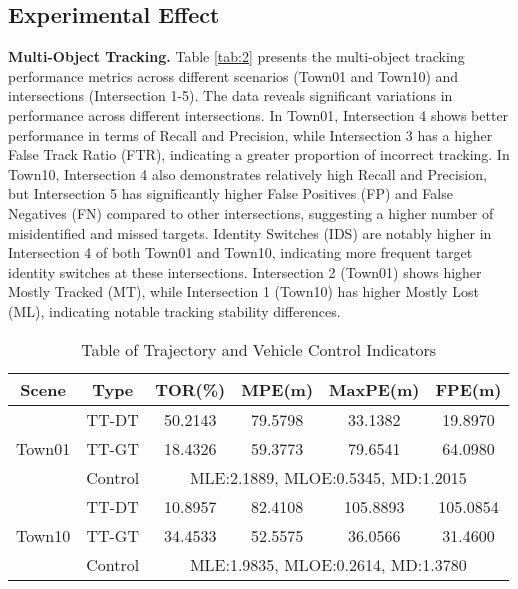 \documentclass[lettersize,journal]{IEEEtran}
\begin{document}
\subsection{Experimental Effect}

\textbf{Multi-Object Tracking.}
Table \ref{tab:2} presents the multi-object tracking performance metrics across different scenarios (Town01 and Town10) and intersections (Intersection 1-5). 
The data reveals significant variations in performance across different intersections. 
In Town01, Intersection 4 shows better performance in terms of Recall and Precision, while Intersection 3 has a higher False Track Ratio (FTR), indicating a greater proportion of incorrect tracking. 
In Town10, Intersection 4 also demonstrates relatively high Recall and Precision, but Intersection 5 has significantly higher False Positives (FP) and False Negatives (FN) compared to other intersections, suggesting a higher number of misidentified and missed targets. 
Identity Switches (IDS) are notably higher in Intersection 4 of both Town01 and Town10, indicating more frequent target identity switches at these intersections. 
Intersection 2 (Town01) shows higher Mostly Tracked (MT), while Intersection 1 (Town10) has higher Mostly Lost (ML), indicating notable tracking stability differences.

\begin{table}[t]
	\centering
	\caption{Table of Trajectory and Vehicle Control Indicators}
	\label{tab:3}
	\renewcommand\arraystretch{1.3}
	\begin{tabular}{|c|c|c|c|c|c|}
		
		\hline
		Scene & Type & TOR(\%) & MPE(m) & MaxPE(m) & FPE(m) \\
		\hline
		\multirow{3}{*}{Town01} & TT-DT & 50.2143 & 79.5798 & 33.1382 & 19.8970 \\
		\cline{2-6}
		& TT-GT & 18.4326 & 59.3773 & 79.6541 & 64.0980 \\
		\cline{2-6}
		& Control & \multicolumn{4}{|c|}{MLE:2.1889, MLOE:0.5345, MD:1.2015} \\
		\hline
		\multirow{3}{*}{Town10} & TT-DT & 10.8957 & 82.4108 & 105.8893 & 105.0854 \\
		\cline{2-6}
		& TT-GT & 34.4533 & 52.5575 & 36.0566 & 31.4600 \\
		\cline{2-6}
		& Control & \multicolumn{4}{|c|}{MLE:1.9835, MLOE:0.2614, MD:1.3780} \\	
		\hline
	\end{tabular}
\end{table}
\end{document}
